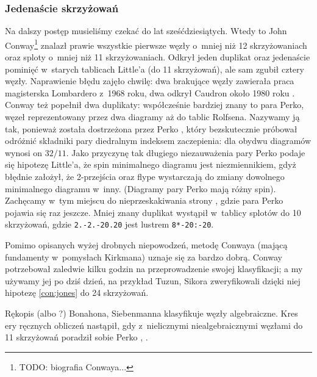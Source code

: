
\subsubsection{Jedenaście skrzyżowań}
\color{white}
Na dalszy postęp musieliśmy czekać do lat sześćdziesiątych.
Wtedy to John Conway\footnote{TODO: biografia Conwaya...} \cite{conway1970} znalazł prawie wszystkie pierwsze węzły o~mniej niż 12 skrzyżowaniach oraz sploty o~mniej niż 11 skrzyżowaniach.
%
Odkrył jeden duplikat oraz jedenaście pominięć w~starych tablicach Little'a (do 11 skrzyżowań), ale sam zgubił cztery węzły.
Naprawienie błędu zajęło chwilę: dwa brakujące węzły zawierała praca magisterska Lombardero z~1968 roku, dwa odkrył Caudron około 1980 roku \cite{caudron1982}.
%
%
Conway też popełnił dwa duplikaty: współcześnie bardziej znany to para Perko, węzeł reprezentowany przez dwa diagramy aż do tablic Rolfsena.
%
Nazywamy ją tak, ponieważ została dostrzeżona przez Perko \cite{perko1974}, który bezskutecznie próbował odróżnić składniki pary diedralnym indeksem zaczepienia: dla obydwu diagramów wynosi on $32/11$.
%
Jako przyczynę tak długiego niezauważenia pary Perko podaje się hipotezę Little'a, że spin minimalnego diagramu jest niezmiennikiem, gdyż błędnie założył, że 2-przejścia oraz flype wystarczają do zmiany dowolnego minimalnego diagramu w~inny.
%
%
(Diagramy pary Perko mają różny spin).
Zachęcamy w~tym miejscu do nieprzeskakiwania strony \pageref{rolfsens_mistake}, gdzie para Perko pojawia się raz jeszcze.
Mniej znany duplikat wystąpił w~tablicy splotów do 10 skrzyżowań, gdzie \texttt{2.-2.-20.20} jest lustrem \texttt{8*-20:-20}.

Pomimo opisanych wyżej drobnych niepowodzeń, metodę Conwaya (mającą fundamenty w~pomysłach Kirkmana) uznaje się za bardzo dobrą.
Conway potrzebował zaledwie kilku godzin na przeprowadzenie swojej klasyfikacji; a my używamy jej po dziś dzień, na przykład Tuzun, Sikora zweryfikowali dzięki niej hipotezę \ref{con:jones} do 24 skrzyżowań.
%
%

Rękopis \cite{siebenmann1979} (albo \cite{bonahon1989}?) Bonahona, Siebenmanna klasyfikuje węzły algebraiczne.
%
%
Kres ery ręcznych obliczeń nastąpił, gdy z~nielicznymi niealgebraicznymi węzłami do 11 skrzyżowań poradził sobie Perko \cite{perko1980}, \cite{perko1982}.
%


